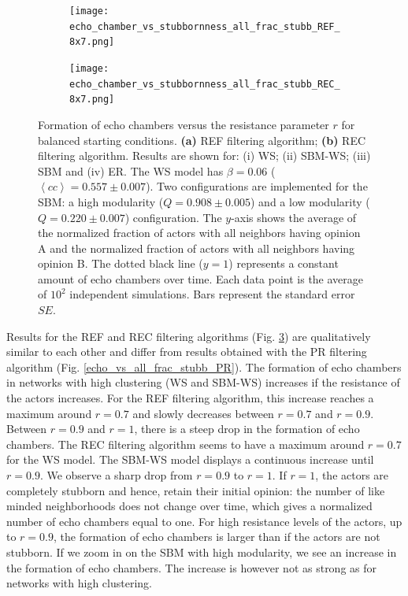 \documentclass[11 pt , letterpaper , twoside , openright]{book}
\begin{document}
\begin{figure}[H]
  \begin{subfigure}[b]{0.49\textwidth}
    \caption{}
  	\texttt{[image: echo\_chamber\_vs\_stubbornness\_all\_frac\_stubb\_REF\_8x7.png]}
    \label{REF_all_frac_stubb}
  \end{subfigure}
  \begin{subfigure}[b]{0.49\textwidth}
    \caption{}
  	\texttt{[image: echo\_chamber\_vs\_stubbornness\_all\_frac\_stubb\_REC\_8x7.png]}
    \label{REC_all_frac_stubb}
  \end{subfigure}
  \captionsetup{format=plain}
  \caption[Formation of echo chambers versus the resistance parameter of the actors, $r$, for balanced starting conditions. The REF and REC filtering algorithms are used]{Formation of echo chambers versus the resistance parameter $r$ for balanced starting conditions. \textbf{(a)} REF filtering algorithm; \textbf{(b)} REC filtering algorithm. Results are shown for: (i) WS; (ii) SBM-WS; (iii) SBM and (iv) ER. The WS model has $\beta = 0.06$ ($\left<cc\right> = 0.557 \pm 0.007$). Two configurations are implemented for the SBM: a high modularity ($Q = 0.908 \pm 0.005$) and a low modularity ($Q = 0.220 \pm 0.007$) configuration. The $y$-axis shows the average of the normalized fraction of actors with all neighbors having opinion A and the normalized fraction of actors with all neighbors having opinion B. The dotted black line ($y=1$) represents a constant amount of echo chambers over time. Each data point is the average of $10^2$ independent simulations. Bars represent the standard error $SE$.}
\label{echo_vs_all_frac_stubb_REF-REC}
\end{figure}
\noindent
Results for the REF and REC filtering algorithms (Fig. \ref{echo_vs_all_frac_stubb_REF-REC}) are qualitatively similar to each other and differ from results obtained with the PR filtering algorithm (Fig. \ref{echo_vs_all_frac_stubb_PR}). The formation of echo chambers in networks with high clustering (WS and SBM-WS) increases if the resistance of the actors increases. For the REF filtering algorithm, this increase reaches a maximum around $r = 0.7$ and slowly decreases between $r = 0.7$ and $r = 0.9$. Between $r = 0.9$ and $r=1$, there is a steep drop in the formation of echo chambers. The REC filtering algorithm seems to have a maximum around $r = 0.7$ for the WS model. The SBM-WS model displays a continuous increase until $r = 0.9$. We observe a sharp drop from $r = 0.9$ to $r=1$. If $r=1$, the actors are completely stubborn and hence, retain their initial opinion: the number of like minded neighborhoods does not change over time, which gives a normalized number of echo chambers equal to one. For high resistance levels of the actors, up to $r = 0.9$, the formation of echo chambers is larger than if the actors are not stubborn. If we zoom in on the SBM with high modularity, we see an increase in the formation of echo chambers. The increase is however not as strong as for networks with high clustering.\\
\end{document}
